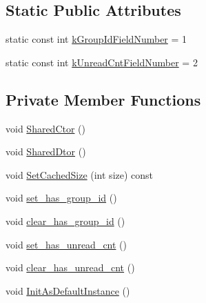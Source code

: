 \subsection*{Static Public Attributes}
\begin{DoxyCompactItemize}
\item 
static const int \hyperlink{class_i_m_1_1_base_define_1_1_client_group_un_read_cnt_a9b4e2c38b9218d1b98bd9422e6cf3cfb}{k\+Group\+Id\+Field\+Number} = 1
\item 
static const int \hyperlink{class_i_m_1_1_base_define_1_1_client_group_un_read_cnt_a1385672b9f1396276fd9f08ec9529f4c}{k\+Unread\+Cnt\+Field\+Number} = 2
\end{DoxyCompactItemize}
\subsection*{Private Member Functions}
\begin{DoxyCompactItemize}
\item 
void \hyperlink{class_i_m_1_1_base_define_1_1_client_group_un_read_cnt_af581b9352162e370b6d828ee49d81355}{Shared\+Ctor} ()
\item 
void \hyperlink{class_i_m_1_1_base_define_1_1_client_group_un_read_cnt_a115b0e92031f3aaa80fa2257895eb496}{Shared\+Dtor} ()
\item 
void \hyperlink{class_i_m_1_1_base_define_1_1_client_group_un_read_cnt_ae58bb5f6b31273635ca28f903e137da9}{Set\+Cached\+Size} (int size) const 
\item 
void \hyperlink{class_i_m_1_1_base_define_1_1_client_group_un_read_cnt_a069e0df749823f42b0d448c38888aeca}{set\+\_\+has\+\_\+group\+\_\+id} ()
\item 
void \hyperlink{class_i_m_1_1_base_define_1_1_client_group_un_read_cnt_a691b84a545e4cb036fb457763653f22e}{clear\+\_\+has\+\_\+group\+\_\+id} ()
\item 
void \hyperlink{class_i_m_1_1_base_define_1_1_client_group_un_read_cnt_aad94d89c260dbd6991b3dd2845d6407f}{set\+\_\+has\+\_\+unread\+\_\+cnt} ()
\item 
void \hyperlink{class_i_m_1_1_base_define_1_1_client_group_un_read_cnt_a539ca7e8ce4e63682fe012494efcdd03}{clear\+\_\+has\+\_\+unread\+\_\+cnt} ()
\item 
void \hyperlink{class_i_m_1_1_base_define_1_1_client_group_un_read_cnt_a83b920e0f99089e39d53afefcf54ceaf}{Init\+As\+Default\+Instance} ()
\end{DoxyCompactItemize}
